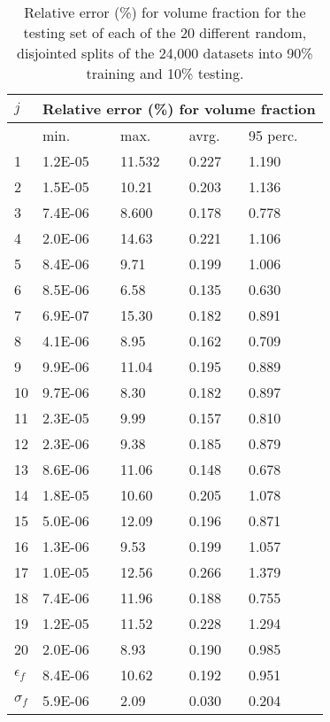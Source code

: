 					
\begin{table}[ht]
  \centering
  \caption{Relative error (\%) for volume fraction for the testing set of each of the
  20 different random, disjointed splits of the 24,000 datasets into 90\% training
  and 10\% testing.}
\begin{tabular}{lllll}
\hline
\hline
    $j$ & \multicolumn{4}{c}{Relative error (\%) for volume fraction} \\
    \hline
			     &min. & max. & avrg. & 95 perc.  \\
\hline

1 &	        1.2E-05	&      11.532	&	0.227	&	1.190 \\
2 &		1.5E-05	&	10.21	&	0.203	&	1.136 \\
3 &		7.4E-06	&	8.600	&	0.178	&	0.778 \\
4 &		2.0E-06	&	14.63	&	0.221	&	1.106 \\
5 &		8.4E-06	&	9.71	&	0.199	&	1.006 \\
6 &		8.5E-06	&	6.58	&	0.135	&	0.630 \\
7 &		6.9E-07	&	15.30	&	0.182	&	0.891 \\
8 &		4.1E-06	&	8.95	&	0.162	&	0.709 \\
9 &		9.9E-06	&	11.04	&	0.195	&	0.889 \\
10 &	9.7E-06	&	8.30	&	0.182	&	0.897 \\
11 &	2.3E-05	&	9.99	&	0.157	&	0.810 \\
12 &	2.3E-06	&	9.38	&	0.185	&	0.879 \\
13 &	8.6E-06	&	11.06	&	0.148	&	0.678 \\
14	&	1.8E-05	&	10.60	&	0.205	&	1.078 \\
15	&	5.0E-06	&	12.09	&	0.196	&	0.871 \\
16	&	1.3E-06	&	9.53	&	0.199	&	1.057 \\
17	&	1.0E-05	&	12.56	&	0.266	&	1.379 \\
18	&	7.4E-06	&	11.96	&	0.188	&	0.755 \\
19	&	1.2E-05	&	11.52	&	0.228	&	1.294 \\
20	&	2.0E-06	&	8.93	&	0.190	&	0.985 \\
\hline				
$\epsilon_f$	&	8.4E-06	&	10.62	&	0.192	&	0.951 \\
\hline
$\sigma_f$	&	5.9E-06	&	2.09	&	0.030	&	0.204 \\

     \hline
 \end{tabular} \label{tab_Error_vol_fraction}%
\end{table}



